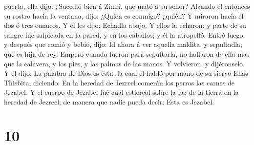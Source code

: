 puerta, ella dijo: ¿Sucedió bien á Zimri, que mató á su señor?
 Alzando él entonces su rostro hacia la ventana, dijo:
¿Quién es conmigo? ¿quién? Y miraron hacia él dos ó tres eunucos.
 Y él les dijo: Echadla abajo. Y ellos la echaron: y
parte de su sangre fué salpicada en la pared, y en los caballos; y él la
atropelló.  Entró luego, y después que comió y bebió,
dijo: Id ahora á ver aquella maldita, y sepultadla; que es hija de rey.
 Empero cuando fueron para sepultarla, no hallaron de
ella más que la calavera, y los pies, y las palmas de las manos.
 Y volvieron, y dijéronselo. Y él dijo: La palabra de
Dios es ésta, la cual él habló por mano de su siervo Elías Thisbita,
diciendo: En la heredad de Jezreel comerán los perros las carnes de
Jezabel.  Y el cuerpo de Jezabel fué cual estiércol sobre
la faz de la tierra en la heredad de Jezreel; de manera que nadie pueda
decir: Esta es Jezabel.

\hypertarget{section-9}{%
\section{10}\label{section-9}}


